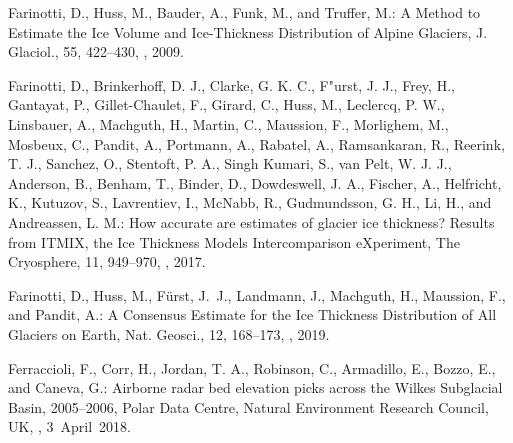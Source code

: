 \documentclass[tc, noline]{copernicus}
\begin{document}
\begin{thebibliography}{95}
Farinotti, D., Huss, M., Bauder, A., Funk, M., and Truffer, M.:
A Method to Estimate the Ice Volume and Ice-Thickness Distribution of Alpine Glaciers,
J. Glaciol.,
55, 422--430, , 2009.

Farinotti, D., Brinkerhoff, D. J., Clarke, G. K. C., F"{u}rst, J. J., Frey, H., Gantayat, P., Gillet-Chaulet, F., Girard, C., Huss, M., Leclercq, P. W., Linsbauer, A., Machguth, H., Martin, C., Maussion, F., Morlighem, M., Mosbeux, C., Pandit, A., Portmann, A., Rabatel, A., Ramsankaran, R., Reerink, T. J., Sanchez, O., Stentoft, P. A., Singh Kumari, S., van Pelt, W. J. J., Anderson, B., Benham, T., Binder, D., Dowdeswell, J. A., Fischer, A., Helfricht, K., Kutuzov, S., Lavrentiev, I., McNabb, R., Gudmundsson, G. H., Li, H., and Andreassen, L. M.: How accurate are estimates of glacier ice thickness? Results from ITMIX, the Ice Thickness Models Intercomparison eXperiment, The Cryosphere, 11, 949--970, , 2017.

Farinotti, D., Huss, M., F{\"u}rst, J.~J., Landmann, J., Machguth, H., Maussion, F., and Pandit, A.:
A Consensus Estimate for the Ice Thickness Distribution of All Glaciers on Earth,
Nat. Geosci.,
12, 168--173, , 2019.

Ferraccioli, F., Corr, H., Jordan, T. A., Robinson, C., Armadillo, E., Bozzo, E., and Caneva, G.: Airborne radar bed elevation picks across the Wilkes Subglacial Basin, 2005--2006, Polar Data Centre, Natural Environment Research Council, UK, , 3~April~2018.


\end{thebibliography}
\end{document}
